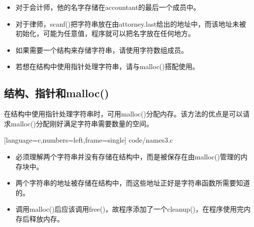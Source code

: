 \begin{frame}[fragile]\ft{\subsecname}
\begin{itemize}
\item 对于会计师，他的名字存储在{\tf accountant}的最后一个成员中。\\[0.1in]
\item 对于律师，{\tf scanf()}把字符串放在由{\tf attorney.last}给出的地址中，而该地址未被初始化，可能为任意值，程序就可以把名字放在任何地方。
\end{itemize}
\end{frame}

\begin{frame}[fragile]\ft{\subsecname}
  \begin{itemize}
  \item \textcolor{acolor1}{如果需要一个结构来存储字符串，请使用字符数组成员。} \\[0.1in]
  \item 若想在结构中使用指针处理字符串，请与{\tf malloc()}搭配使用。
  \end{itemize}
\end{frame}

\subsection{结构、指针和malloc()}
\begin{frame}[fragile]\ft{\subsecname}
在结构中使用指针处理字符串时，可用{\tf malloc()}分配内存。该方法的优点是可以请求{\tf malloc()}分配刚好满足字符串需要数量的空间。
\end{frame}

\begin{frame}\ft{\subsecname}
  
  [language=c,numbers=left,frame=single]  
  {code/names3.c}
\end{frame}



\begin{frame}[fragile]\ft{\subsecname}
  \begin{itemize}
  \item 必须理解两个字符串并没有存储在结构中，而是被保存在由{\tf malloc()}管理的内存块中。\\[0.1in]
  \item 两个字符串的地址被存储在结构中，而这些地址正好是字符串函数所需要知道的。\\[0.1in]
  \item 调用{\tf malloc()}后应该调用{\tf free()}，故程序添加了一个{\tf cleanup()}，在程序使用完内存后释放内存。
  \end{itemize}
\end{frame}
